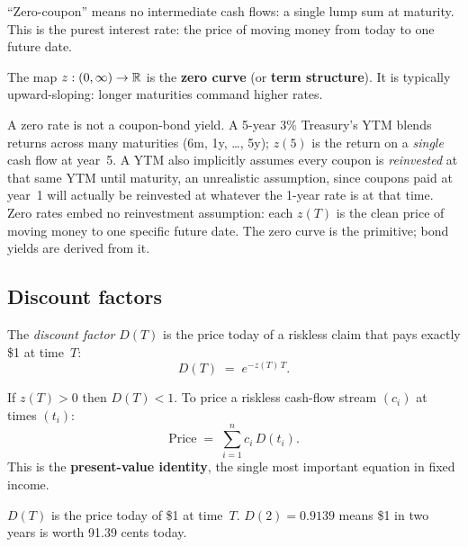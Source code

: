 ``Zero-coupon'' means no intermediate cash flows: a single lump sum
at maturity.  This is the purest interest rate: the price of
moving money from today to one future date.

The map $z : (0, \infty) \to \mathbb{R}$ is the \textbf{zero curve} (or
\textbf{term structure}).  It is typically upward-sloping: longer
maturities command higher rates.

\begin{pitfallbox}
A zero rate is not a coupon-bond yield.  A 5-year 3\% Treasury's YTM
blends returns across many maturities (6m, 1y, \ldots, 5y); $z(5)$
is the return on a \emph{single} cash flow at year~5.  A YTM also
implicitly assumes every coupon is \emph{reinvested} at that same
YTM until maturity, an unrealistic assumption, since coupons paid
at year~1 will actually be reinvested at whatever the 1-year rate is
at that time.  Zero rates embed no reinvestment assumption: each
$z(T)$ is the clean price of moving money to one specific future
date.  The zero curve is the primitive; bond yields are derived
from it.
\end{pitfallbox}

\subsection{Discount factors}

\begin{definition}
\label{def:discount_factor}
The \emph{discount factor} $D(T)$ is the price today of a riskless
claim that pays exactly \$1 at time~$T$:
\begin{equation}
  D(T) \;=\; e^{-z(T)\,T}.
  \label{eq:discount_factor}
\end{equation}
\end{definition}

If $z(T) > 0$ then $D(T) < 1$.  To price a riskless cash-flow stream
$(c_i)$ at times $(t_i)$:
\begin{equation}
  \text{Price} \;=\; \sum_{i=1}^{n} c_i \, D(t_i).
  \label{eq:pv_cashflows}
\end{equation}
This is the \textbf{present-value identity}, the single most
important equation in fixed income.

\begin{intuitionbox}
$D(T)$ is the price today of \$1 at time~$T$.  $D(2) = 0.9139$ means
\$1 in two years is worth 91.39 cents today.
\end{intuitionbox}

